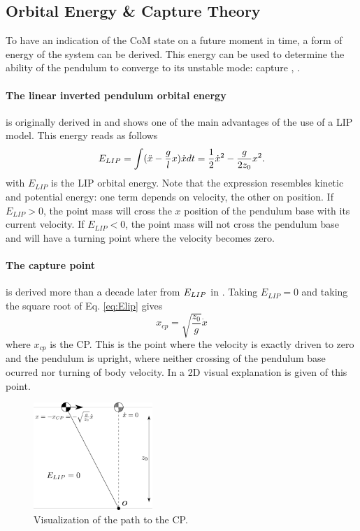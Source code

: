 \subsection{Orbital Energy \& Capture Theory}\label{sec:ewalking}
To have an indication of the \ac{CoM} state on a future moment in time, a form of energy of the system can be derived. This energy can be used to determine the ability of the pendulum to converge to its unstable mode: capture \cite{pratt2006capture}, \cite{koolen2012capturability}.

\paragraph{The linear inverted pendulum orbital energy}\label{subsec:liporbit} is originally derived in \cite{kajita1992dynamic} and shows one of the main advantages of the use of a \ac{LIP} model.  This energy reads as follows
\begin{equation}
E_{LIP} = \int (\ddot{x}-\frac{g}{l}x)\dot{x} dt = \frac{1}{2}\dot{x}^2-\frac{g}{2z_0}x^2.
\label{eq:Elip}
\end{equation}
with $E_{LIP}$ is the \ac{LIP} orbital energy. Note that the expression resembles kinetic and potential energy: one term depends on velocity, the other on position. If $E_{LIP}>0$, the point mass will cross the $x$ position of the pendulum base with its current velocity. If $E_{LIP}<0$, the point mass will not cross the pendulum base and will have a turning point where the velocity becomes zero.

\paragraph{The capture point} is derived more than a decade later from $E_{LIP}$ in \cite{pratt2006capture}. Taking $E_{LIP}=0$ and taking the square root of Eq.  \eqref{eq:Elip} gives
\begin{equation}
x_{cp}=\sqrt{ \frac{z_0}{g}}\dot{x} 
\label{eq:cp}
\end{equation}
where $x_{cp}$ is the \ac{CP}. This is the point where the velocity is exactly driven to zero and the pendulum is upright, where neither crossing of the pendulum base ocurred nor turning of body velocity. In  a \ac{2D} visual explanation is given of this point.
\begin{figure}[h]
\centering
\includegraphics[width=0.4\textwidth]{STYLESTUFF/2DICP.png}
\caption{Visualization of the path to the \ac{CP}. }
\label{fig:2dicp}
\end{figure}

